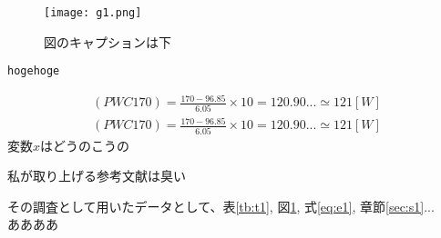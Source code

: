 \documentclass[dvipdfmx]{article}
\begin{document}
    \begin{figure}[H]
        \begin{center}
            \texttt{[image: g1.png]} %
            \caption{図のキャプションは下\label{fig:g1}}
        \end{center}
    \end{figure}

    \begin{lstlisting}[basicstyle=\ttfamily\footnotesize, frame=single]
hogehoge
    \end{lstlisting}

    \begin{align}
        \label{eq:e1}
        (PWC170) = \frac{170 - 96.85}{6.05} \times 10 = 120.90... \simeq 121 [W]\\ %
        (PWC170) = \frac{170 - 96.85}{6.05} \times 10 = 120.90... \simeq 121 [W]
    \end{align}
    $ 変数x $はどうのこうの

    私が取り上げる参考文献\cite{YJ1919}は臭い

    その調査として用いたデータとして、表\ref{tb:t1}, 図\ref{fig:g1}, 式\ref{eq:e1}, 章節\ref{sec:s1}...\\
    ああああ %

    
\end{document}
